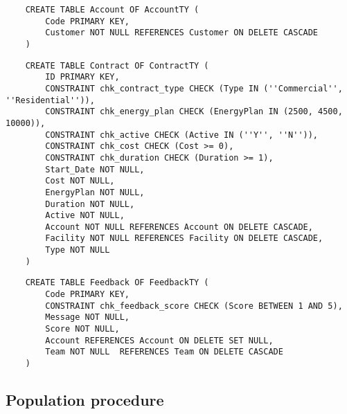 \begin{lstlisting}
    CREATE TABLE Account OF AccountTY (
        Code PRIMARY KEY,
        Customer NOT NULL REFERENCES Customer ON DELETE CASCADE
    )
\end{lstlisting}


\begin{lstlisting}
    CREATE TABLE Contract OF ContractTY (
        ID PRIMARY KEY,
        CONSTRAINT chk_contract_type CHECK (Type IN (''Commercial'', ''Residential'')),
        CONSTRAINT chk_energy_plan CHECK (EnergyPlan IN (2500, 4500, 10000)),
        CONSTRAINT chk_active CHECK (Active IN (''Y'', ''N'')),
        CONSTRAINT chk_cost CHECK (Cost >= 0),
        CONSTRAINT chk_duration CHECK (Duration >= 1),
        Start_Date NOT NULL,
        Cost NOT NULL,
        EnergyPlan NOT NULL,
        Duration NOT NULL,
        Active NOT NULL,
        Account NOT NULL REFERENCES Account ON DELETE CASCADE,
        Facility NOT NULL REFERENCES Facility ON DELETE CASCADE,
        Type NOT NULL
    )
\end{lstlisting}


\begin{lstlisting}
    CREATE TABLE Feedback OF FeedbackTY (
        Code PRIMARY KEY,
        CONSTRAINT chk_feedback_score CHECK (Score BETWEEN 1 AND 5),
        Message NOT NULL,
        Score NOT NULL,
        Account REFERENCES Account ON DELETE SET NULL,
        Team NOT NULL  REFERENCES Team ON DELETE CASCADE
    )
\end{lstlisting}

\subsection{Population procedure}

